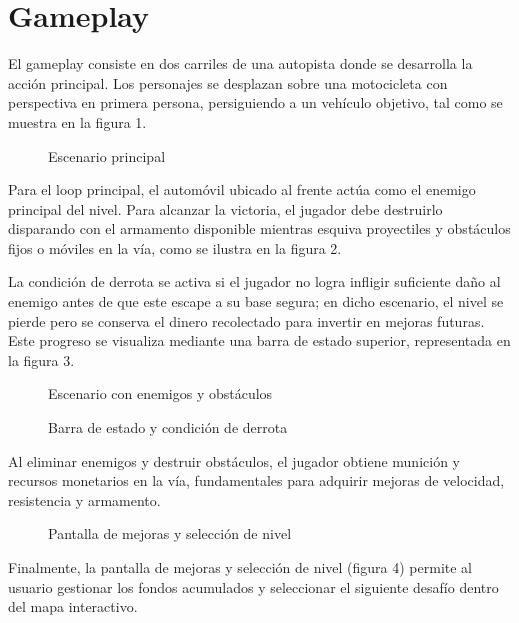 \section{Gameplay}

El gameplay consiste en dos carriles de una autopista donde se desarrolla la acción principal. Los personajes se desplazan sobre una motocicleta con perspectiva en primera persona, persiguiendo a un vehículo objetivo, tal como se muestra en la figura 1.

\begin{figure}[H]
    \centering
    \caption{Escenario principal}
    \label{fig:escenario_principal}
\end{figure}

Para el loop principal, el automóvil ubicado al frente actúa como el enemigo principal del nivel. Para alcanzar la victoria, el jugador debe destruirlo disparando con el armamento disponible mientras esquiva proyectiles y obstáculos fijos o móviles en la vía, como se ilustra en la figura 2.

La condición de derrota se activa si el jugador no logra infligir suficiente daño al enemigo antes de que este escape a su base segura; en dicho escenario, el nivel se pierde pero se conserva el dinero recolectado para invertir en mejoras futuras. Este progreso se visualiza mediante una barra de estado superior, representada en la figura 3.

\begin{figure}[H]
    \centering
    \caption{Escenario con enemigos y obstáculos}
    \label{fig:escenario_enemigos}
\end{figure}

\begin{figure}[H]
    \centering
    \caption{Barra de estado y condición de derrota}
    \label{fig:barra_perder}
\end{figure}

Al eliminar enemigos y destruir obstáculos, el jugador obtiene munición y recursos monetarios en la vía, fundamentales para adquirir mejoras de velocidad, resistencia y armamento.

\begin{figure}[H]
    \centering
    \caption{Pantalla de mejoras y selección de nivel}
    \label{fig:pantalla_mejoras}
\end{figure}

Finalmente, la pantalla de mejoras y selección de nivel (figura 4) permite al usuario gestionar los fondos acumulados y seleccionar el siguiente desafío dentro del mapa interactivo.
